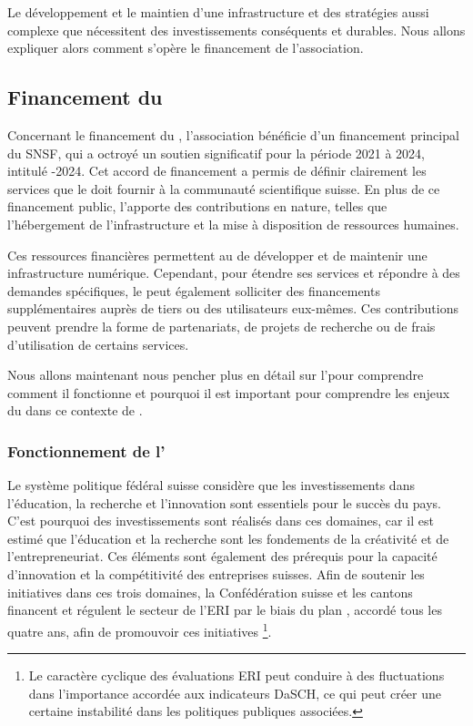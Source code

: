         Le développement et le maintien d'une infrastructure et des stratégies aussi complexe que \dsc nécessitent des investissements conséquents et durables. Nous allons expliquer alors comment s'opère le financement de l'association.
        
        \subsection{Financement du \dsc}

        Concernant le financement du \dsc, l'association bénéficie d'un financement principal du SNSF, qui a octroyé un soutien significatif pour la période 2021 à 2024, intitulé -2024. Cet accord de financement a permis de définir clairement les services que le \dsc doit fournir à la communauté scientifique suisse. En plus de ce financement public, l'\unibas apporte des contributions en nature, telles que l'hébergement de l'infrastructure et la mise à disposition de ressources humaines.

        Ces ressources financières permettent au \dsc de développer et de maintenir une infrastructure numérique. Cependant, pour étendre ses services et répondre à des demandes spécifiques, le \dsc peut également solliciter des financements supplémentaires auprès de tiers ou des utilisateurs eux-mêmes. Ces contributions peuvent prendre la forme de partenariats, de projets de recherche ou de frais d'utilisation de certains services.

        Nous allons maintenant nous pencher plus en détail sur l'\erid pour comprendre comment il fonctionne et pourquoi il est important pour comprendre les enjeux du \dsc dans ce contexte de \psdn.

            \subsubsection{Fonctionnement de l'\erid}
            Le système politique fédéral suisse considère que les investissements dans l'éducation, la recherche et l'innovation sont essentiels pour le succès du pays. C'est pourquoi des investissements sont réalisés dans ces domaines, car il est estimé que l'éducation et la recherche sont les fondements de la créativité et de l'entrepreneuriat. Ces éléments sont également des prérequis pour la capacité d'innovation et la compétitivité des entreprises suisses. Afin de soutenir les initiatives dans ces trois domaines, la Confédération suisse et les cantons financent et régulent le secteur de l'ERI par le biais du plan \ERID, accordé tous les quatre ans, afin de promouvoir ces initiatives \footnote{Le caractère cyclique des évaluations ERI peut conduire à des fluctuations dans l'importance accordée aux indicateurs DaSCH, ce qui peut créer une certaine instabilité dans les politiques publiques associées.}.
    
